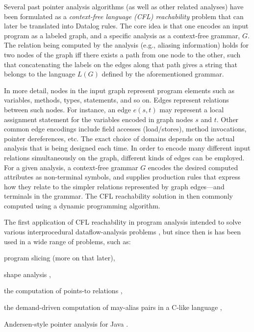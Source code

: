 Several past pointer analysis algorithms (as well as other related analyses) have been formulated as a \emph{context-free language (CFL) reachability} problem \cite{ilps:1997:Reps} that can later be translated into Datalog rules. The core idea is that one encodes an input program as a labeled graph, and a specific analysis as a context-free grammar, $G$. The relation being computed by the analysis (e.g., aliasing information) holds for two nodes of the graph iff there exists a path from one node to the other, such that concatenating the labels on the edges along that path gives a string that belongs to the language $L(G)$ defined by the aforementioned grammar.

In more detail, nodes in the input graph represent program elements such as variables, methods, types, statements, and so on. Edges represent relations between such nodes. For instance, an edge $e(s, t)$ may represent a local assignment statement for the variables encoded in graph nodes $s$ and $t$. Other common edge encodings include field accesses (load/stores), method invocations, pointer dereferences, etc. The exact choice of domains depends on the actual analysis that is being designed each time. In order to encode many different input relations simultaneously on the graph, different kinds of edges can be employed. For a given analysis, a context-free grammar $G$ encodes the desired computed attributes as non-terminal symbols, and supplies production rules that express how they relate to the simpler relations represented by graph edges---and terminals in the grammar. The CFL reachability solution in then commonly computed using a dynamic programming algorithm.

The first application of CFL reachability in program analysis intended to solve various interprocedural dataflow-analysis problems \cite{popl:1995:Reps,pppj:2014:Milanova}, but since then is has been used in a wide range of problems, such as:
\begin{inparaenum}[(1)]
\item program slicing \cite{fse:1994:Reps} (more on that later),
\item shape analysis \cite{pepm:1995:Reps},
\item the computation of points-to relations \cite{article:1998:Reps,cgo:2012:Lei,pldi:2006:Sridharan,oopsla:2005:Sridharan,ecoop:2009:Xu,cc:2013:Lu},
\item the demand-driven computation of may-alias pairs in a C-like language \cite{popl:2008:Zheng},
\item Andersen-style pointer analysis for Java \cite{oopsla:2005:Sridharan}.
\end{inparaenum}


